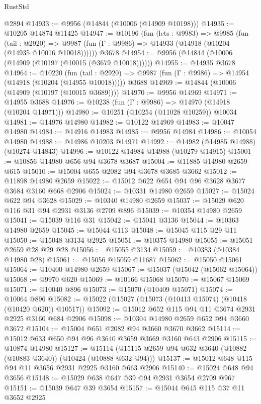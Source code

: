 \begin{lexlean}{RustStd}
\begin{coremodule}
    @2894
@14933 := @9956 (@14844 (@10006 (@14909 @10198)))
@14935 := @10205 @14874 @11425
@14947 := @10196
    (fun (lets : @9983) =>
    @9985
      (fun (tail : @2920) =>
      @9987 (fun (Γ : @9986) => @14933 (@14918 (@10204 (@14935 @10016 @10018))))))
    @3678
@14954 := @9956 (@14844 (@10006 (@14909 (@10197 (@10015 (@3679 @10018))))))
@14955 := @14935 @3678
@14964 := @10220
    (fun (tail : @2920) => @9987 (fun (Γ : @9986) => @14954 (@14918 (@10204 (@14955 @10018)))))
    @3688
@14969 := @14844 (@10006 (@14909 (@10197 (@10015 @3689))))
@14970 := @9956 @14969
@14971 := @14955 @3688
@14976 := @10238 (fun (Γ : @9986) => @14970 (@14918 (@10204 @14971)))
@14980 := @10251 (@10254 (@11028 @10259)) @10034
@14981 := @14976 @14980
@14982 := @10122 @14969
@14983 := @10047 @14980
@14984 := @14916 @14983
@14985 := @9956 @14984
@14986 := @10054 @14980
@14988 := @14986 @10203 @14971
@14992 := @14982 (@14985 @14988) (@10274 @14843)
@14996 := @10122 @14984 @14988 (@10279 @14915)
@15001 := @10856 @14980 @656 @94 @3678 @3687
@15004 := @11885 @14980 @2659 @615
@15010 := @15004 @655 @2082 @94 @3678 @3685 @3662
@15012 := @11898 @14980 @2659
@15022 := @15012 @622 @654 @94 @96 @3628 @3677 @3684 @3160 @668 @2906
@15024 := @10331 @14980 @2659
@15027 := @15024 @622 @94 @3628
@15029 := @10340 @14980 @2659
@15037 := @15029 @620 @116 @31 @94 @2931 @3136 @2709 @896
@15039 := @10354 @14980 @2659
@15041 := @15039 @116 @31
@15042 := @15041 @3136
@15044 := @10363 @14980 @2659
@15045 := @15044 @113
@15048 := @15045 @115 @29 @11
@15050 := @15048 @3134 @2925
@15051 := @10375 @14980
@15055 := @15051 @2659 @28 @29 @28
@15056 := @15055 @3134
@15059 := @10383 (@10384 @14980 @28)
@15061 := @15056 @15059 @11687
@15062 := @15050 @15061
@15064 := @10400 @14980 @2659
@15067 := @15037 (@15042 (@15062 @15064))
@15068 := @9970 @620
@15069 := @10166 @15068
@15070 := @15067 @15069
@15071 := @10040 @896
@15073 := @15070 (@10409 @15071)
@15074 := @10064 @896
@15082 := @15022 (@15027 (@15073 (@10413 @15074) (@10418 (@10420 @620)) @10517))
@15092 := @15012 @652 @115 @94 @11 @3674 @2931 @2925 @3160 @684 @2906
@15098 := @10304 @14980 @2659 @652 @94 @3660 @3672
@15104 := @15004 @651 @2082 @94 @3660 @3670 @3662
@15114 := @15012 @633 @650 @94 @96 @3640 @3659 @3669 @3160 @643 @2906
@15115 := @10874 @14980
@15127 := @15114 (@15115 @2659 @94 @632 @3640 (@10882 (@10883 @3640)) (@10424 (@10888 @632 @94)))
@15137 := @15012 @648 @115 @94 @11 @3656 @2931 @2925 @3160 @663 @2906
@15140 := @15024 @648 @94 @3656
@15148 := @15029 @638 @647 @39 @94 @2931 @3654 @2709 @967
@15151 := @15039 @647 @39 @3654
@15157 := @15044 @645 @115 @37 @11 @3652 @2925

\end{coremodule}
\end{lexlean}
